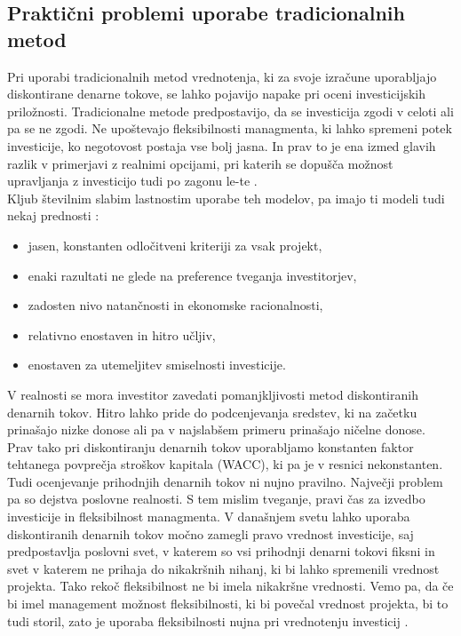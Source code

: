 \documentclass[12pt, a4paper]{amsart}
\theoremstyle{definition} %
\theoremstyle{plain} %
\begin{document}
\subsection{Praktični problemi uporabe tradicionalnih metod}
Pri uporabi tradicionalnih metod vrednotenja, ki za svoje izračune uporabljajo diskontirane denarne tokove, se lahko pojavijo napake pri oceni investicijskih priložnosti. Tradicionalne metode predpostavijo, da se investicija zgodi v celoti ali pa se ne zgodi. Ne upoštevajo fleksibilnosti managmenta, ki lahko spremeni potek investicije, ko negotovost postaja vse bolj jasna. In prav to je ena izmed glavih razlik v primerjavi z realnimi opcijami, pri katerih se dopušča možnost upravljanja z investicijo tudi po zagonu le-te \cite[str. 65, 66]{Mun}.\\
Kljub številnim slabim lastnostim uporabe teh modelov, pa imajo ti modeli tudi nekaj prednosti \cite[str. 66]{Mun}:
\begin{itemize}
\item jasen, konstanten odločitveni kriteriji za vsak projekt,
\item enaki razultati ne glede na preference tveganja investitorjev,
\item zadosten nivo natančnosti in ekonomske racionalnosti,
\item relativno enostaven in hitro učljiv,
\item enostaven za utemeljitev smiselnosti investicije.
\end{itemize}
V realnosti se mora investitor zavedati pomanjkljivosti metod diskontiranih denarnih tokov. Hitro lahko pride do podcenjevanja sredstev, ki na začetku prinašajo nizke donose ali pa v najslabšem primeru prinašajo ničelne donose. Prav tako pri diskontiranju denarnih tokov uporabljamo konstanten faktor tehtanega povprečja stroškov kapitala (WACC), ki pa je v resnici nekonstanten. Tudi ocenjevanje prihodnjih denarnih tokov ni nujno pravilno. Največji problem pa so dejstva poslovne realnosti. S tem mislim tveganje, pravi čas za izvedbo investicije in fleksibilnost managmenta. V današnjem svetu lahko uporaba diskontiranih denarnih tokov močno zamegli pravo vrednost investicije, saj predpostavlja poslovni svet, v katerem so vsi prihodnji denarni tokovi fiksni in svet v katerem ne prihaja do nikakršnih nihanj, ki bi lahko spremenili vrednost projekta. Tako rekoč fleksibilnost ne bi imela nikakršne vrednosti. Vemo pa, da če bi imel management možnost fleksibilnosti, ki bi povečal vrednost projekta, bi to tudi storil, zato je uporaba fleksibilnosti nujna pri vrednotenju investicij \cite[str. 66]{Mun}.\\
\end{document}
